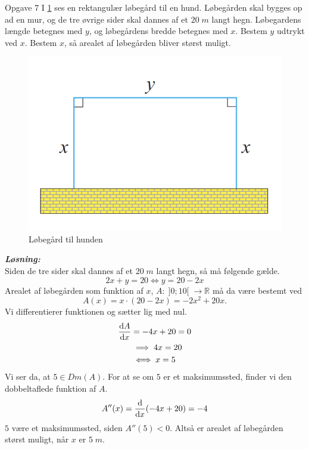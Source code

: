 \documentclass{article}
\newcommand{\sol}{\setlength{\parindent}{0cm}\textbf{\textit{Løsning:}}\setlength{\parindent}{1cm}}
\begin{document}
\begin{question}{Opgave 7}{}
 I \cref{fig:hund} ses en rektangulær løbegård til en hund.  
Løbegården skal bygges op ad en mur,
og de tre øvrige sider skal dannes af et $20 \;\unit{m} $ langt hegn. Løbegardens længde betegnes med $y$, og løbegårdens bredde betegnes med $x$.
Bestem $y$ udtrykt ved $x$. Bestem $x$, så arealet af løbegården bliver størst muligt.
\end{question}
\begin{figure}[H]
\begin{center}
  \includegraphics[scale=0.5]{Hund.png}
\end{center}
\caption{Løbegård til hunden}
\label{fig:hund}
\end{figure}
\sol \\ 
Siden de tre sider skal dannes af et $20 \;\unit{m  } $ langt hegn, så må følgende gælde. 
\[
2x+y=20 \iff y=20-2x
\] 
Arealet af løbegården som funktion af $x$, $A:\;]0;10[\;\to \mathbb{R}$ må da være bestemt ved
\[
A(x)=x\cdot (20 - 2x)=-2x^2+20x.
\] 
Vi differentierer funktionen og sætter lig med nul.
\begin{equation*}
\begin{split}
  \dv{A}{x}&=-4x+20 = 0 \\ 
  &\implies 4x=20 \\ 
  &\iff x=5
\end{split}
\end{equation*}
Vi ser da, at $5 \in Dm(A)$. For at se om $5$ er et maksimumssted, finder vi den dobbeltaflede funktion af $A$.
\[
A''(x)=\dv{x} (-4x + 20) = -4
\] 
$5$ være et maksimumssted, siden $A''(5)<0$. Altså er arealet af løbegården størst muligt, når $x$ er $5 \;\unit{m} $.
\end{document}
